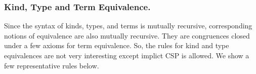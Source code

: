 \subsubsection{Kind, Type and Term Equivalence.}

Since the syntax of kinds, types, and terms is mutually recursive,
corresponding notions of equivalence are also mutually recursive.
They are congruences closed under a few axioms for term equivalence.
So, the rules for kind and type equivalences are not very interesting
except implict CSP is allowed.
We show a few representative rules below.

  {\small
    \begin{center}
      \hfil
      \\[2mm]
    \end{center}
  }



